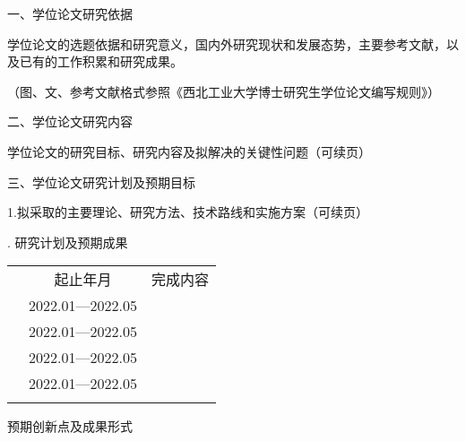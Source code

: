 \documentclass[AutoFakeBold]{article}
\begin{document}
\setlength\parindent{2em}
{\songti\noindent 一、学位论文研究依据}

{\kaishu\noindent 学位论文的选题依据和研究意义，国内外研究现状和发展态势，主要参考文献，以及已有的工作积累和研究成果。}

{\color{red}\songti{}\noindent（图、文、参考文献格式参照《西北工业大学博士研究生学位论文编写规则》）}

\zhlipsum[1-10][name=zhufu]

\nocite{*}



\fakebreak
{\songti\noindent 二、学位论文研究内容}

{\kaishu\noindent 学位论文的研究目标、研究内容及拟解决的关键性问题（可续页）}

\zhlipsum[11-12][name=zhufu]

\fakebreak
{\songti\noindent 三、学位论文研究计划及预期目标}

{\kaishu\noindent 1.拟采取的主要理论、研究方法、技术路线和实施方案（可续页）}

\zhlipsum[13-14][name=zhufu]


\zhlipsum[16-18][name=zhufu]

\fakebreak
\setlength\parindent{0em}
{. 研究计划及预期成果}
\begin{ttcbtab}[frame empty, before={\vskip 5pt}]
  \songti{}
  \renewcommand\arraystretch{1.5}
  \begin{tabularx}{\textwidth}{c|c|X}
    \hline
    &\hspace*{0.25cm} 起止年月 \hspace*{0.25cm} & \hfil 完成内容 \hfil\\ 
    & 2022.01---2022.05 & \\ 
    & 2022.01---2022.05 & \\ 
    & 2022.01---2022.05 & \\ 
    & 2022.01---2022.05 & \\ 
    & & \\ \hline
  \end{tabularx}
\end{ttcbtab}
\setlength\parindent{2em}
{\kaishu\noindent 预期创新点及成果形式\par}

\zhlipsum[19-20][name=zhufu]
\end{document}
